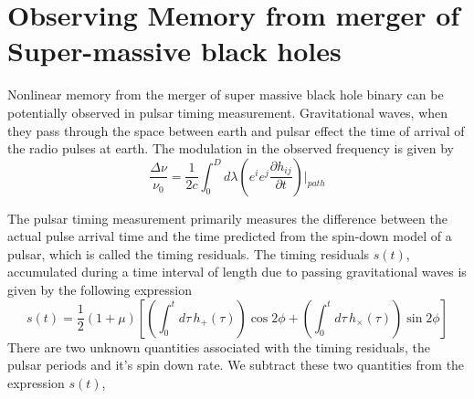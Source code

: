 \documentclass[twocolumn,showpacs,aps,prd,nobibnotes,floatfix]{revtex4-1}
\begin{document}
\section{Observing Memory from merger of Super-massive black holes  }
Nonlinear memory from the merger of super massive black hole binary can be potentially observed in pulsar timing measurement. Gravitational waves, when they pass through the space between earth and pulsar effect the time of arrival of the radio pulses at earth. The modulation in the observed frequency is given by
\begin{equation}
\frac{\Delta \nu}{\nu_{0}} = \frac{1}{2c}\int_{0}^{D}d\lambda \left(e^{i}e^{j}\frac{\partial h_{ij}}{\partial t}\right) \Bigg\vert_{path}
\end{equation}

The pulsar timing measurement primarily measures the difference between the actual pulse arrival time and the time predicted from the spin-down model of a pulsar, which is called the timing residuals. The timing residuals $s(t)$, accumulated during a time interval of length due to passing gravitational waves is given by the following expression 
\begin{equation}
	s(t) = \frac{1}{2}(1+\mu)\left[\left(\int_{0}^{t}d\tau \, h_{+}(\tau)\right)\cos 2\phi + \left(\int_{0}^{t}d\tau \, h_{\times}(\tau)\right)\sin 2\phi\right]
\end{equation}
There are two unknown quantities associated with the timing residuals, the pulsar periods and it's spin down rate. We subtract these two quantities from the expression $s(t)$, 
  
\end{document}
